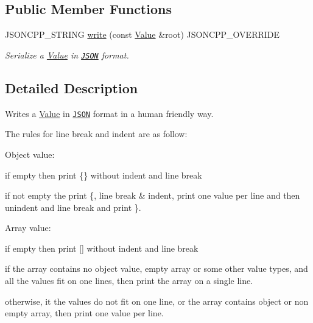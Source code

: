 \subsection*{Public Member Functions}
\begin{DoxyCompactItemize}
\item 
J\+S\+O\+N\+C\+P\+P\+\_\+\+S\+T\+R\+I\+NG \hyperlink{classJson_1_1StyledWriter_a5efab19b9746da9920c29cdae3a6b404}{write} (const \hyperlink{classJson_1_1Value}{Value} \&root) J\+S\+O\+N\+C\+P\+P\+\_\+\+O\+V\+E\+R\+R\+I\+DE
\begin{DoxyCompactList}\small\item\em Serialize a \hyperlink{classJson_1_1Value}{Value} in \href{http://www.json.org}{\tt J\+S\+ON} format. \end{DoxyCompactList}\end{DoxyCompactItemize}


\subsection{Detailed Description}
Writes a \hyperlink{classJson_1_1Value}{Value} in \href{http://www.json.org}{\tt J\+S\+ON} format in a human friendly way. 

The rules for line break and indent are as follow\+:
\begin{DoxyItemize}
\item Object value\+:
\begin{DoxyItemize}
\item if empty then print \{\} without indent and line break
\item if not empty the print \textquotesingle{}\{\textquotesingle{}, line break \& indent, print one value per line and then unindent and line break and print \textquotesingle{}\}\textquotesingle{}.
\end{DoxyItemize}
\item Array value\+:
\begin{DoxyItemize}
\item if empty then print \mbox{[}\mbox{]} without indent and line break
\item if the array contains no object value, empty array or some other value types, and all the values fit on one lines, then print the array on a single line.
\item otherwise, it the values do not fit on one line, or the array contains object or non empty array, then print one value per line.
\end{DoxyItemize}
\end{DoxyItemize}

